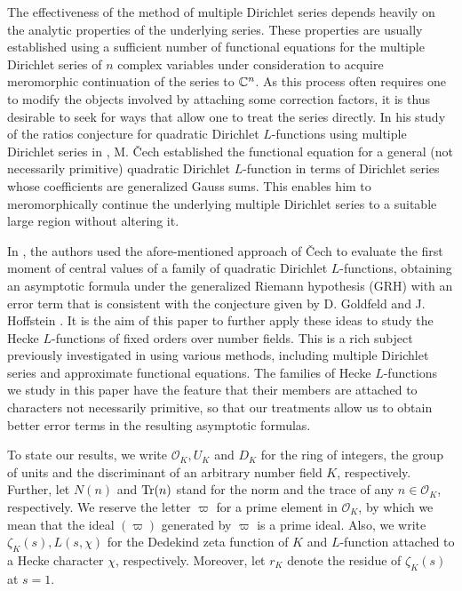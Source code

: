 \documentclass[twoside,leqno,10pt, A4]{amsart}
\begin{document}
   The effectiveness of the method of multiple Dirichlet series depends heavily on the analytic properties of the underlying series.  These properties are usually established using a sufficient number of functional equations for the multiple Dirichlet series of $n$ complex variables under consideration to acquire meromorphic continuation of the series to $\mathbb C^n$. As this process often requires one to modify the objects
involved by attaching some correction factors, it is thus desirable to seek for ways that allow one to treat the series directly. In his study
of the ratios conjecture for quadratic Dirichlet $L$-functions using multiple Dirichlet series in \cite{Cech1},  M. \v Cech
established the functional equation for a general (not necessarily primitive) quadratic Dirichlet $L$-function in terms of Dirichlet series
whose coefficients are generalized Gauss sums. This enables him to meromorphically continue the underlying multiple Dirichlet series
to a suitable large region without altering it. \newline

  In \cite{G&Zhao2023-3}, the authors used the afore-mentioned approach of \v Cech to evaluate the first moment of central values of a family of quadratic
Dirichlet $L$-functions, obtaining an asymptotic formula under the generalized Riemann hypothesis (GRH) with an error term that is consistent with
the conjecture given by D. Goldfeld and J. Hoffstein \cite{DoHo}. It is the aim of this paper to further apply these ideas to
study the Hecke $L$-functions of fixed orders over number fields.  This is a rich subject previously investigated in \cites{FaHL, FHL,
Luo, Diac, BFH05, DT05, G&Zhao1, G&Zhao3, G&Zhao2020,G&Zhao2023-4,G&Zhao2023-5} using various methods, including multiple Dirichlet series
and approximate functional equations. The families of Hecke $L$-functions we study in this paper have the feature that their members are attached to characters not necessarily primitive, so that our treatments allow us to obtain better error terms in the resulting asymptotic formulas. \newline

  To state our results, we write $\mathcal{O}_K, U_K$ and $D_K$ for the ring of integers, the group of units and the discriminant of  an
arbitrary number field $K$, respectively. Further, let $N(n)$ and ${\rm Tr}(n)$ stand for the norm and the trace of any $n \in \mathcal{O}_K$,
respectively. We reserve the letter $\varpi$ for a prime element in $\mathcal O_K$, by which we mean that the ideal $(\varpi)$ generated by
$\varpi$ is a prime ideal. Also, we write $\zeta_K(s), L(s, \chi)$ for the Dedekind zeta function of $K$ and $L$-function attached to a Hecke
character $\chi$, respectively.  Moreover, let $r_K$ denote the residue of $\zeta_K(s)$ at $s = 1$. \newline
\end{document}
